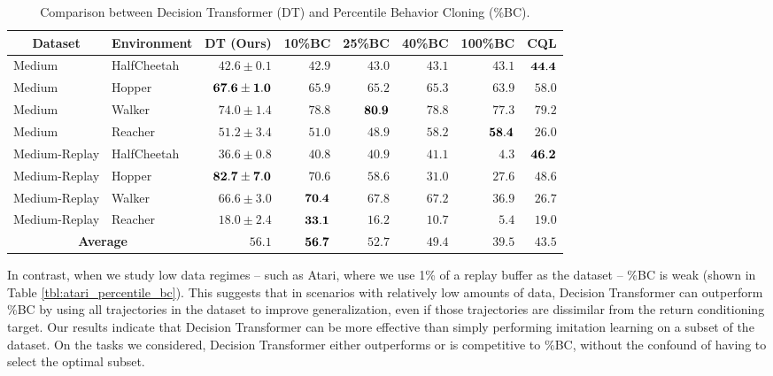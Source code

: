 \begin{table}[h]
\centering
\small
\begin{tabular}{llrrrrrr}
\toprule
\multicolumn{1}{c}{\bf Dataset} & \multicolumn{1}{c}{\bf Environment} & \multicolumn{1}{c}{\bf DT (Ours)} & \multicolumn{1}{c}{\bf 10\%BC} & \multicolumn{1}{c}{\bf 25\%BC} & \multicolumn{1}{c}{\bf 40\%BC} & \multicolumn{1}{c}{\bf 100\%BC} & \multicolumn{1}{c}{\bf CQL} \\
\midrule
Medium        & HalfCheetah &  $42.6 \pm 0.1$  & $42.9$ & $43.0$ & $43.1$ & $43.1$ & $\bf 44.4$ \\
Medium        & Hopper      &  $\bf 67.6 \pm 1.0$  & $65.9$ & $65.2$ & $65.3$ & $63.9$ & $58.0$ \\
Medium        & Walker      &  $74.0 \pm 1.4$  & $78.8$ & $\bf 80.9$ & $78.8$ & $77.3$ & $79.2$ \\
Medium        & Reacher     &  $51.2 \pm 3.4$  & $51.0$ & $48.9$ & $58.2$ & $\bf 58.4$ & $26.0$ \\
\midrule
Medium-Replay & HalfCheetah &  $36.6 \pm 0.8$  & $40.8$ & $40.9$ & $41.1$ &  $4.3$ & $\bf 46.2$ \\
Medium-Replay & Hopper      &  $\bf 82.7 \pm 7.0$  & $70.6$ & $58.6$ & $31.0$ & $27.6$ & $48.6$ \\
Medium-Replay & Walker      &  $66.6 \pm 3.0$  & $\bf 70.4$ & $67.8$ & $67.2$ & $36.9$ & $26.7$ \\
Medium-Replay & Reacher     &  $18.0 \pm 2.4$  & $\bf 33.1$ & $16.2$ & $10.7$ &  $5.4$ & $19.0$ \\
\midrule
\multicolumn{2}{c}{\bf Average} &  $56.1$ & $\bf{56.7}$ & $52.7$ & $49.4$ & $39.5$ & $43.5$ \\
\bottomrule
\end{tabular}
\caption{
Comparison between Decision Transformer (DT) and Percentile Behavior Cloning (\%BC).}
\label{tbl:pct_bc}
\end{table}

In contrast, when we study low data regimes -- such as Atari, where we use 1\% of a replay buffer as the dataset -- \%BC is weak (shown in Table \ref{tbl:atari_percentile_bc}).
This suggests that in scenarios with relatively low amounts of data, Decision Transformer can outperform \%BC by using all trajectories in the dataset to improve generalization, even if those trajectories are dissimilar from the return conditioning target.
Our results indicate that Decision Transformer can be more effective than simply performing imitation learning on a subset of the dataset.
On the tasks we considered, Decision Transformer either outperforms or is competitive to \%BC, without the confound of having to select the optimal subset.

